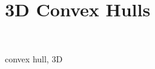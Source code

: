 \chapter{3D Convex Hulls}
\label{chap:convex_hull_3}
\minitoc
{} \\

\begin{ccPackage}{convex hull, 3D}


\end{ccPackage}

